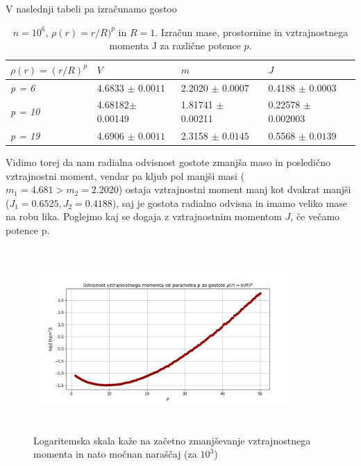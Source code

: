 \documentclass[11pt, a4paper]{article}
\begin{document}
V naslednji tabeli pa izračunamo gostoo
\begin{table}[H]
\caption{ $n=10^6$, $\rho(r) = r/R)^p $ in $R=1$. Izračun mase, prostornine in vztrajnostnega momenta J za različne potence $p$.}
\begin{tabular}{llll}
\centering
 $\rho(r) = (r/R)^p$ \vline & $V$ & $m$ & $J$\\ \hline
 \textit{p = 6} & 4.6833 $\pm$ $0.0011$ & 2.2020 $\pm$ $0.0007$& 0.4188 $\pm$ $0.0003$\\\hline
  \textit{p = 10} & 4.68182$\pm$ 0.00149  & 1.81741 $ \pm $ 0.00211 & 0.22578  $\pm$ 0.002003 \\\hline
 \textit{p = 19} & 4.6906 $\pm$ $0.0011$ & 2.3158 $\pm$ $0.0145$ & 0.5568 $\pm$ $0.0139$
\end{tabular}
\end{table}
Vidimo torej da nam radialna odvisnost gostote zmanjša maso in posledično vztrajnostni moment, vendar pa kljub pol manjši masi ($m_1 = 4.681 > m_2 = 2.2020$) ostaja vztrajnostni moment manj kot dvakrat manjši ($J_1 = 0.6525 , J_2 = 0.4188$), saj je gostota radialno odvisna in imamo veliko mase na robu lika. \newline\newline
Poglejmo kaj se dogaja z vztrajnostnim momentom $J$, če večamo potence p. 
\begin{figure}[H]
\centering 
  \includegraphics[width=10cm, height=7cm]{prva_vztrajnsotnimoment.png}
 \caption{Logaritemska skala kaže na začetno zmanjševanje vztrajnostnega momenta in nato močnan naraščaj (za $10^3$)}
\end{figure} 
\end{document}

